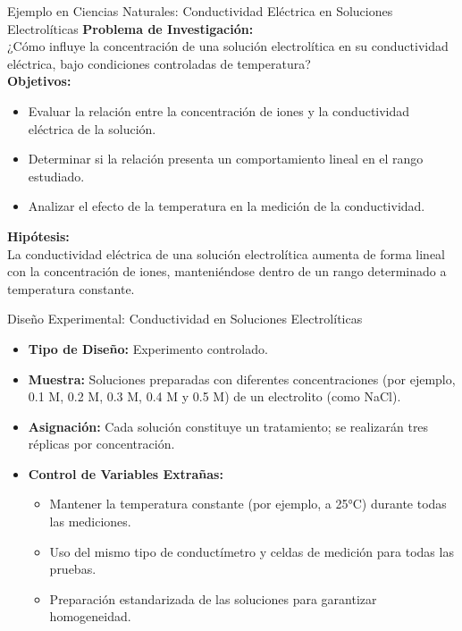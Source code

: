 ﻿\documentclass{beamer}
\begin{document}
\begin{frame}{Ejemplo en Ciencias Naturales: Conductividad Eléctrica en Soluciones Electrolíticas}
  \textbf{Problema de Investigación:}\\
  ¿Cómo influye la concentración de una solución electrolítica en su conductividad eléctrica, bajo condiciones controladas de temperatura?\\[3mm]
  
  \textbf{Objetivos:}
  \begin{itemize}
      \item Evaluar la relación entre la concentración de iones y la conductividad eléctrica de la solución.
      \item Determinar si la relación presenta un comportamiento lineal en el rango estudiado.
      \item Analizar el efecto de la temperatura en la medición de la conductividad.
  \end{itemize}
  
  \textbf{Hipótesis:}\\
  La conductividad eléctrica de una solución electrolítica aumenta de forma lineal con la concentración de iones, manteniéndose dentro de un rango determinado a temperatura constante.
\end{frame}

\begin{frame}{Diseño Experimental: Conductividad en Soluciones Electrolíticas}
  \begin{itemize}
      \item \textbf{Tipo de Diseño:} Experimento controlado.
      \item \textbf{Muestra:} Soluciones preparadas con diferentes concentraciones (por ejemplo, 0.1 M, 0.2 M, 0.3 M, 0.4 M y 0.5 M) de un electrolito (como NaCl).
      \item \textbf{Asignación:} Cada solución constituye un tratamiento; se realizarán tres réplicas por concentración.
      \item \textbf{Control de Variables Extrañas:}
      \begin{itemize}
          \item Mantener la temperatura constante (por ejemplo, a 25°C) durante todas las mediciones.
          \item Uso del mismo tipo de conductímetro y celdas de medición para todas las pruebas.
          \item Preparación estandarizada de las soluciones para garantizar homogeneidad.
      \end{itemize}
  \end{itemize}
\end{frame}
\end{document}
